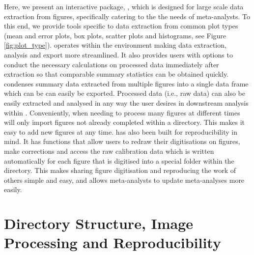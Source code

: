 \documentclass[article]{jss}
\begin{document}
Here, we present an interactive  package, , which is designed for large scale data extraction from figures, specifically catering to the the needs of meta-analysts. To this end, we provide tools specific to data extraction from common plot types (mean and error plots, box plots, scatter plots and histograms, see Figure \ref{fig:plot_type}).  operates within the  environment making data extraction, analysis and export more streamlined. 
It also provides users with options to conduct the necessary calculations on processed data immediately after extraction so that comparable summary statistics can be obtained quickly.  condenses summary data extracted from multiple figures into a single data frame which can be can easily be exported. Processed data (i.e., raw data) can also be easily extracted and analysed in any way the user desires in downstream analysis within . Conveniently, when needing to process many figures at different times  will only import figures not already completed within a directory. This makes it easy to add new figures at any time.  has also been built for reproducibility in mind. It has functions that allow users to redraw their digitisations on figures, make corrections and access the raw calibration data which is written automatically for each figure that is digitised into a special folder within the directory. This makes sharing figure digitisation and reproducing the work of others simple and easy, and allows meta-analysts to update meta-analyses more easily.







\section{Directory Structure, Image Processing and Reproducibility}
\end{document}
